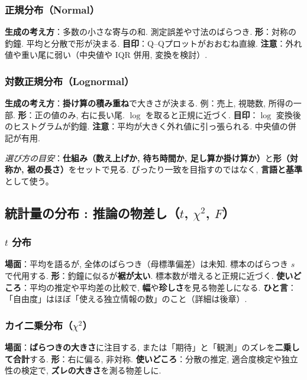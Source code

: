     \subsubsection*{正規分布（Normal）}
      \textbf{生成の考え方}：多数の小さな寄与の和. 測定誤差や寸法のばらつき.  
      \textbf{形}：対称の釣鐘. 平均と分散で形が決まる.  
      \textbf{目印}：Q--Qプロットがおおむね直線.  
      \textbf{注意}：外れ値や重い尾に弱い（中央値や IQR 併用, 変換を検討）.

    \subsubsection*{対数正規分布（Lognormal）}
      \textbf{生成の考え方}：\textbf{掛け算の積み重ね}で大きさが決まる. 例：売上, 視聴数, 所得の一部.  
      \textbf{形}：正の値のみ, 右に長い尾. $\log$ を取ると正規に近づく.  
      \textbf{目印}：$\log$ 変換後のヒストグラムが釣鐘.  
      \textbf{注意}：平均が大きく外れ値に引っ張られる. 中央値の併記が有用.

    \medskip
    \noindent \textit{選び方の目安}：\textbf{仕組み（数え上げか, 待ち時間か, 足し算か掛け算か）}と\textbf{形（対称か, 裾の長さ）}をセットで見る.  
    ぴったり一致を目指すのではなく, \textbf{言語と基準}として使う。

  \subsection{統計量の分布 : 推論の物差し（$t$, $\chi^2$, $F$）}
    \subsubsection*{$t$ 分布}
      \textbf{場面}：平均を語るが, 全体のばらつき（母標準偏差）は未知. 標本のばらつき $s$ で代用する.  
      \textbf{形}：釣鐘に似るが\textbf{裾が太い}. 標本数が増えると正規に近づく.  
      \textbf{使いどころ}：平均の推定や平均差の比較で, \textbf{幅}や\textbf{珍しさ}を見る物差しになる.  
      \textbf{ひと言}：「自由度」はほぼ「使える独立情報の数」のこと（詳細は後章）.

    \subsubsection*{カイ二乗分布（$\chi^2$）}
      \textbf{場面}：\textbf{ばらつきの大きさ}に注目する, または「期待」と「観測」のズレを\textbf{二乗して合計}する.  
      \textbf{形}：右に偏る, 非対称.  
      \textbf{使いどころ}：分散の推定, 適合度検定や独立性の検定で, \textbf{ズレの大きさ}を測る物差しに.

